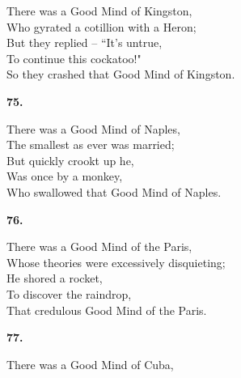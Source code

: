 \documentclass{book}
\begin{document}
{\noindent
\hspace*{14mm}       There was a Good Mind of Kingston, \\
\hspace*{14mm}       Who gyrated a cotillion with a Heron; \\
\hspace*{14mm}       But they replied -- ``It's untrue, \\
\hspace*{14mm}       To continue this cockatoo!" \\
\hspace*{14mm}       So they crashed that Good Mind of Kingston.
\begin{center}
\textbf{    75.}
\end{center}
\par
\noindent
\hspace*{14mm}       There was a Good Mind of Naples, \\
\hspace*{14mm}       The smallest as ever was married; \\
\hspace*{14mm}       But quickly crookt up he, \\
\hspace*{14mm}       Was once by a monkey, \\
\hspace*{14mm}       Who swallowed that Good Mind of Naples.
\begin{center}
\textbf{    76.}
\end{center}
\par
\noindent
\hspace*{14mm}       There was a Good Mind of the Paris, \\
\hspace*{14mm}       Whose theories were excessively disquieting; \\
\hspace*{14mm}       He shored a rocket, \\
\hspace*{14mm}       To discover the raindrop, \\
\hspace*{14mm}       That credulous Good Mind of the Paris.
\begin{center}
\textbf{    77.}
\end{center}
\par
\noindent
\hspace*{14mm}       There was a Good Mind of Cuba, \\
}
\end{document}
